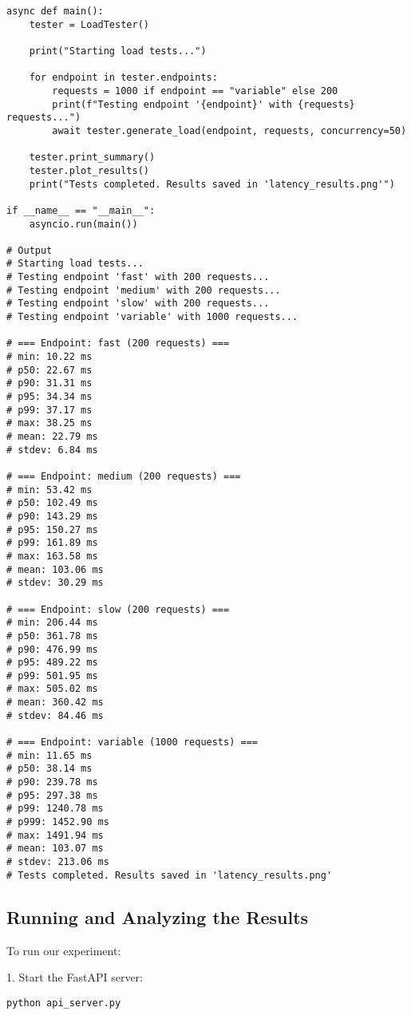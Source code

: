 \documentclass[12pt,letterpaper]{article}
\newenvironment{macterminal}{%
    \begin{mdframed}[
        linecolor=terminalFrame,
        backgroundcolor=terminalBg,
        roundcorner=5pt,
        skipabove=10pt,
        skipbelow=10pt,
        linewidth=1pt,
        innertopmargin=10pt, %
        frametitle={%
            \tikz[baseline=(current bounding box.east), outer sep=0pt]{
                \fill[red!80!black] (0,0) circle (5pt);
                \fill[yellow!80!black] (0.7,0) circle (5pt);
                \fill[green!70!black] (1.4,0) circle (5pt);
            }
        },
        frametitlealignment=\raggedright, %
        frametitleaboveskip=8pt, %
        frametitlebelowskip=0pt, %
    ]
}{%
    \end{mdframed}%
}
\begin{document}
\begin{macterminal}
\begin{lstlisting}
async def main():
    tester = LoadTester()
    
    print("Starting load tests...")
    
    for endpoint in tester.endpoints:
        requests = 1000 if endpoint == "variable" else 200
        print(f"Testing endpoint '{endpoint}' with {requests} requests...")
        await tester.generate_load(endpoint, requests, concurrency=50)
    
    tester.print_summary()
    tester.plot_results()
    print("Tests completed. Results saved in 'latency_results.png'")

if __name__ == "__main__":
    asyncio.run(main())

# Output
# Starting load tests...
# Testing endpoint 'fast' with 200 requests...
# Testing endpoint 'medium' with 200 requests...
# Testing endpoint 'slow' with 200 requests...
# Testing endpoint 'variable' with 1000 requests...

# === Endpoint: fast (200 requests) ===
# min: 10.22 ms
# p50: 22.67 ms
# p90: 31.31 ms
# p95: 34.34 ms
# p99: 37.17 ms
# max: 38.25 ms
# mean: 22.79 ms
# stdev: 6.84 ms

# === Endpoint: medium (200 requests) ===
# min: 53.42 ms
# p50: 102.49 ms
# p90: 143.29 ms
# p95: 150.27 ms
# p99: 161.89 ms
# max: 163.58 ms
# mean: 103.06 ms
# stdev: 30.29 ms

# === Endpoint: slow (200 requests) ===
# min: 206.44 ms
# p50: 361.78 ms
# p90: 476.99 ms
# p95: 489.22 ms
# p99: 501.95 ms
# max: 505.02 ms
# mean: 360.42 ms
# stdev: 84.46 ms

# === Endpoint: variable (1000 requests) ===
# min: 11.65 ms
# p50: 38.14 ms
# p90: 239.78 ms
# p95: 297.38 ms
# p99: 1240.78 ms
# p999: 1452.90 ms
# max: 1491.94 ms
# mean: 103.07 ms
# stdev: 213.06 ms
# Tests completed. Results saved in 'latency_results.png'
\end{lstlisting}
\end{macterminal}

\subsection{Running and Analyzing the Results}

To run our experiment:

1. Start the FastAPI server:
\begin{macterminal}
\begin{lstlisting}
python api_server.py
\end{lstlisting}
\end{macterminal}
\end{document}
